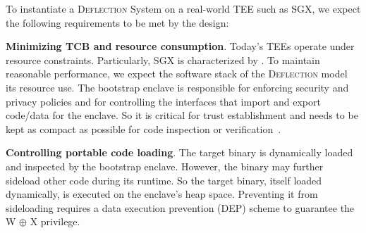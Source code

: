 To instantiate a \textsc{Deflection} System on a real-world TEE such as SGX, we expect the following requirements to be met by the design: 


\vspace{3pt}\noindent\textbf{Minimizing TCB and resource consumption}.\label{challenge-tcb}\label{challenge-size} 
Today's TEEs operate under resource constraints.  Particularly, SGX is characterized by \DIFdelbegin {}\DIFdelend \DIFaddbegin {}\DIFaddend . To maintain reasonable performance, we expect the software stack of the \textsc{Deflection} model \DIFdelbegin {}\DIFdelend \DIFaddbegin {}\DIFaddend its resource use. The bootstrap enclave is responsible for enforcing security and privacy policies and for controlling the interfaces that import and export code/data for the enclave. So it is critical for trust establishment and needs to be kept as compact as possible for code inspection or verification~\cite{mccune2008flicker}.  

\vspace{3pt}\noindent\textbf{Controlling portable code loading}.\label{challenge-dep} The target binary is dynamically loaded and inspected by the bootstrap enclave. However, the binary may further sideload other code during its runtime. 
So the target binary, itself loaded dynamically, is executed on the enclave's heap space. Preventing it from sideloading requires a data execution prevention (DEP) scheme to guarantee the W $\oplus$ X privilege.



